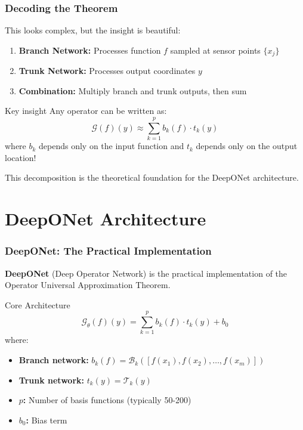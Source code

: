 \documentclass[notes]{beamer}
\begin{document}
\begin{frame}
\frametitle{Decoding the Theorem}

This looks complex, but the insight is beautiful:

\begin{enumerate}
    \item \textbf{Branch Network:} Processes function $f$ sampled at sensor points $\{x_j\}$
    \item \textbf{Trunk Network:} Processes output coordinates $y$
    \item \textbf{Combination:} Multiply branch and trunk outputs, then sum
\end{enumerate}

\begin{block}{Key insight}
Any operator can be written as:
\begin{equation*}
\mathcal{G}(f)(y) \approx \sum_{k=1}^p b_k(f) \cdot t_k(y)
\end{equation*}
where $b_k$ depends only on the input function and $t_k$ depends only on the output location!
\end{block}

This decomposition is the theoretical foundation for the DeepONet architecture.

\end{frame}

\section{DeepONet Architecture}

\begin{frame}
\frametitle{DeepONet: The Practical Implementation}

\textbf{DeepONet} (Deep Operator Network) is the practical implementation of the Operator Universal Approximation Theorem.

\begin{block}{Core Architecture}
\begin{equation*}
\mathcal{G}_\theta(f)(y) = \sum_{k=1}^p b_k(f) \cdot t_k(y) + b_0
\end{equation*}
where:
\begin{itemize}
    \item \textbf{Branch network:} $b_k(f) = \mathcal{B}_k([f(x_1), f(x_2), \ldots, f(x_m)])$
    \item \textbf{Trunk network:} $t_k(y) = \mathcal{T}_k(y)$
    \item \textbf{$p$:} Number of basis functions (typically 50-200)
    \item \textbf{$b_0$:} Bias term
\end{itemize}
\end{block}

\end{frame}
\end{document}
